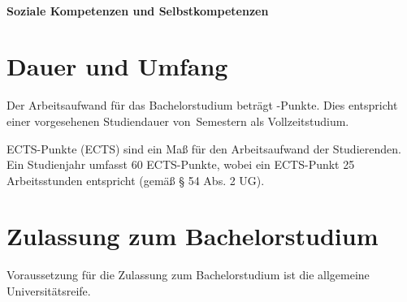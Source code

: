 \paragraph{Soziale Kompetenzen und Selbstkompetenzen}
%

%

\section{Dauer und Umfang}\label{sec:DU}

Der Arbeitsaufwand für das Bachelorstudium \emph{}
beträgt -Punkte. Dies entspricht einer vorgesehenen
Studiendauer von \,Semes\-tern als Vollzeitstudium.

ECTS-Punkte (ECTS) sind ein Maß für den Arbeitsaufwand der Studierenden.
Ein Studienjahr umfasst 60 ECTS-Punkte, wobei ein ECTS-Punkt 25
Arbeitsstunden entspricht (gemäß § 54 Abs. 2 UG).

\section{Zulassung zum Bachelorstudium}\label{sec:ZB}

Voraussetzung für die Zulassung zum Bachelorstudium \emph{}
ist die allgemeine Universitätsreife.

%
\newcommand*\Deutsch[1][B2]{%
  Für einen erfolgreichen Studienfortgang werden Deutschkenntnisse
  nach Referenzniveau #1 des Gemeinsamen Europäischen
  Referenzrahmens für Sprachen empfohlen.%
}%
\newcommand*\Englisch[1][B1]{
  \par
  In einzelnen Lehrveranstaltungen kann der Vortrag in englischer
  Sprache stattfinden bzw.\ können die Unterlagen in englischer
  Sprache vorliegen. Daher werden Englischkenntnisse auf
  Referenzniveau #1 des Gemeinsamen Europäischen Referenzrahmens für
  Sprachen empfohlen.%
}%
\newcommand*\DarstellendeGeometrie{%
  \par
  Zusätzlich ist vor vollständiger Ablegung der Bachelorprüfung gemäß
  §4 Abs.\,1 lit.\,c Universitätsberechtigungsverordnung~-- UBVO
  (BGBl.\,II Nr.\,44/1998 idgF.)~-- eine Zusatzprüfung über
  Darstellende Geometrie abzulegen, wenn die in §4 Abs.\,4 UBVO
  festgelegten Kriterien nicht erfüllt sind. Der\_Die Vizerektor\_in
  für Studium und Lehre hat dies festzustellen und auf dem
  Studienblatt zu vermerken.%
  \par
}%

